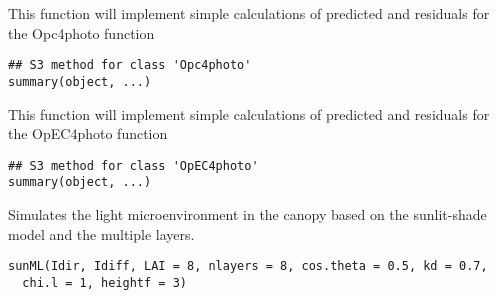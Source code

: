 \documentclass[letterpaper]{book}
\begin{document}
%
\begin{Arguments}
\begin{ldescription}
\item[\code{object}] 
\end{ldescription}
\end{Arguments}
%
\begin{Description}\relax
This function will implement simple calculations of
predicted and residuals for the Opc4photo function
\end{Description}
%
\begin{Usage}
\begin{verbatim}
## S3 method for class 'Opc4photo'
summary(object, ...)
\end{verbatim}
\end{Usage}
%
\begin{Description}\relax
This function will implement simple calculations of
predicted and residuals for the OpEC4photo function
\end{Description}
%
\begin{Usage}
\begin{verbatim}
## S3 method for class 'OpEC4photo'
summary(object, ...)
\end{verbatim}
\end{Usage}
%
\begin{Description}\relax
Simulates the light microenvironment in the canopy based on
the sunlit-shade model and the multiple layers.
\end{Description}
%
\begin{Usage}
\begin{verbatim}
sunML(Idir, Idiff, LAI = 8, nlayers = 8, cos.theta = 0.5, kd = 0.7,
  chi.l = 1, heightf = 3)
\end{verbatim}
\end{Usage}
%
\end{document}
